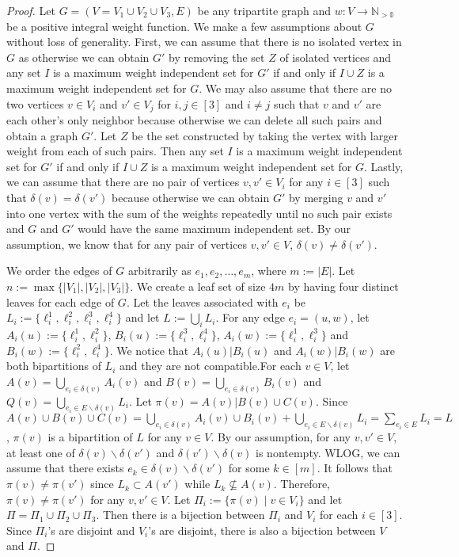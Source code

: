 \documentclass{bmcart}
\begin{document}
\begin{proof}
  Let $G = (V=V_1 \cup V_2 \cup V_3, E)$ be any tripartite graph and $w:V \to \mathbb{N_{>0}}$ be a positive integral weight function. We make a few assumptions about $G$ without loss of generality. First, we can assume that there is no isolated vertex in $G$ as otherwise we can obtain $G'$ by removing the set $Z$ of isolated vertices and any set $I$ is a maximum weight independent set for $G'$ if and only if $I \cup Z$ is a maximum weight independent set for $G$. We may also assume that there are no two vertices $v \in V_i$ and $v' \in V_j$ for $i,j \in [3]$ and $i \neq j$ such that $v$ and $v'$ are each other's only neighbor because otherwise we can delete all such pairs and obtain a graph $G'$. Let $Z$ be the set constructed by taking the vertex with larger weight from each of such pairs. Then any set $I$ is a maximum weight independent set for $G'$ if and only if $I \cup Z$ is a maximum weight independent set for $G$. Lastly, we can assume that there are no pair of vertices $v,v' \in V_i$ for any $i \in [3]$ such that $\delta(v) = \delta(v')$ because otherwise we can obtain $G'$ by merging $v$ and $v'$ into one vertex with the sum of the weights repeatedly until no such pair exists and $G$ and $G'$ would have the same maximum independent set. By our assumption, we know that for any pair of vertices $v,v'\in V$, $\delta(v) \neq \delta(v')$.
  \smallskip

  We order the edges of $G$ arbitrarily as $e_1,e_2,\dots,e_m$, where $m:=|E|$. Let $n:= \max\{|V_1|,|V_2|,|V_3|\}$. We create a leaf set of size $4m$ by having four distinct leaves for each edge of $G$. Let the leaves associated with $e_i$ be $L_i := \{\ell_i^1,\ell_i^2,\ell_i^3,\ell_i^4\}$ and let $L := \bigcup_i L_i$. For any edge $e_i = (u,w)$, let $A_i(u) := \{\ell_i^1, \ell_i^2\}$, $B_i(u) := \{\ell_i^3, \ell_i^4\}$, $A_i(w) := \{\ell_i^1, \ell_i^3\}$ and $B_i(w) := \{\ell_i^2, \ell_i^4\}$. We notice that $A_i(u)|B_i(u)$ and $A_i(w)|B_i(w)$ are both bipartitions of $L_i$ and they are not compatible.For each $v \in V$, let $A(v) = \bigcup_{e_i \in \delta(v)} A_i(v)$ and $B(v) = \bigcup_{e_i \in \delta(v)} B_i(v)$ and $Q(v) = \bigcup_{e_i \in E\backslash \delta(v)} L_i$. Let $\pi(v) = A(v)|B(v)\cup C(v)$. Since $A(v)\cup B(v) \cup C(v) = \bigcup_{e_i \in \delta(v)} A_i(v) \cup B_i(v) + \bigcup_{e_i \in E\backslash \delta(v)} L_i = \sum_{e_i \in E} L_i = L$, $\pi(v)$ is a bipartition of $L$ for any $v \in V$. By our assumption, for any $v, v' \in V$, at least one of $\delta(v) \backslash \delta(v')$ and $\delta(v') \backslash \delta(v)$ is nontempty. WLOG, we can assume that there exists $e_k \in \delta(v) \backslash \delta(v')$ for some $k \in [m]$. It follows that $\pi(v) \neq \pi(v')$ since $L_k \subset A(v')$ while $L_k \nsubseteq A(v)$. Therefore, $\pi(v) \neq \pi(v')$ for any $v,v' \in V$. Let $\Pi_i := \{\pi(v) \mid v \in V_i\}$ and let $\Pi = \Pi_1 \cup \Pi_2 \cup \Pi_3$. Then there is a bijection between $\Pi_i$ and $V_i$ for each $i \in [3]$. Since $\Pi_i$'s are disjoint and $V_i$'s are disjoint, there is also a bijection between $V$ and $\Pi$.\smallskip
 

\end{proof}
\end{document}
